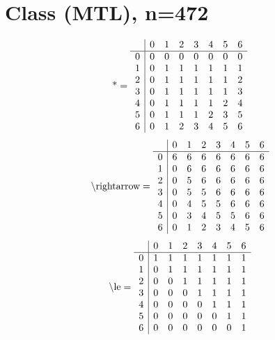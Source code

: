 \documentclass[11pt]{article}
\begin{document}
\section{Class (MTL), n=472}
\[\text{*} = 
\begin{array}{r | r r r r r r r}
 & 0 & 1 & 2 & 3 & 4 & 5 & 6 \\ \hline
0 & 0 & 0 & 0 & 0 & 0 & 0 & 0 \\
1 & 0 & 1 & 1 & 1 & 1 & 1 & 1 \\
2 & 0 & 1 & 1 & 1 & 1 & 1 & 2 \\
3 & 0 & 1 & 1 & 1 & 1 & 1 & 3 \\
4 & 0 & 1 & 1 & 1 & 1 & 2 & 4 \\
5 & 0 & 1 & 1 & 1 & 2 & 3 & 5 \\
6 & 0 & 1 & 2 & 3 & 4 & 5 & 6 \\
\end{array}
\]
\[\text{\textbackslash rightarrow} = 
\begin{array}{r | r r r r r r r}
 & 0 & 1 & 2 & 3 & 4 & 5 & 6 \\ \hline
0 & 6 & 6 & 6 & 6 & 6 & 6 & 6 \\
1 & 0 & 6 & 6 & 6 & 6 & 6 & 6 \\
2 & 0 & 5 & 6 & 6 & 6 & 6 & 6 \\
3 & 0 & 5 & 5 & 6 & 6 & 6 & 6 \\
4 & 0 & 4 & 5 & 5 & 6 & 6 & 6 \\
5 & 0 & 3 & 4 & 5 & 5 & 6 & 6 \\
6 & 0 & 1 & 2 & 3 & 4 & 5 & 6 \\
\end{array}
\]
\[\text{\textbackslash le} = 
\begin{array}{r | r r r r r r r}
 & 0 & 1 & 2 & 3 & 4 & 5 & 6 \\ \hline
0 & 1 & 1 & 1 & 1 & 1 & 1 & 1 \\
1 & 0 & 1 & 1 & 1 & 1 & 1 & 1 \\
2 & 0 & 0 & 1 & 1 & 1 & 1 & 1 \\
3 & 0 & 0 & 0 & 1 & 1 & 1 & 1 \\
4 & 0 & 0 & 0 & 0 & 1 & 1 & 1 \\
5 & 0 & 0 & 0 & 0 & 0 & 1 & 1 \\
6 & 0 & 0 & 0 & 0 & 0 & 0 & 1 \\
\end{array}
\]
\end{document}
